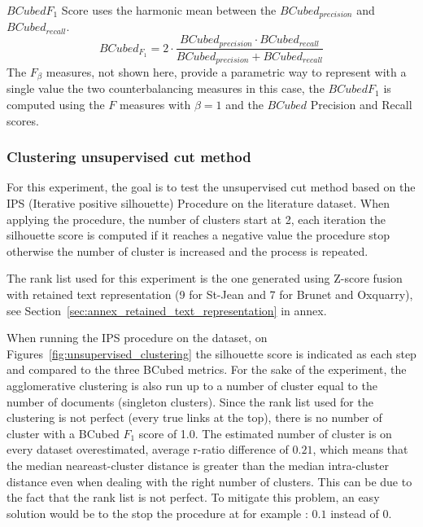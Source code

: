 \begin{definition}
  $BCubed F_1$ Score uses the harmonic mean between the $BCubed_{precision}$ and $BCubed_{recall}$.
  \begin{equation}
    BCubed_{F_1} =
    2 \cdot \frac{BCubed_{precision} \cdot BCubed_{recall}}
    {BCubed_{precision} + BCubed_{recall}}
  \end{equation}
  The $F_\beta$ measures, not shown here, provide a parametric way to represent with a single value the two counterbalancing measures in this case, the $BCubed F_1$ is computed using the $F$ measures with $\beta = 1$ and the $BCubed$ Precision and Recall scores.
\end{definition}

\subsubsection{Clustering unsupervised cut method}

For this experiment, the goal is to test the unsupervised cut method based on the IPS (Iterative positive silhouette) Procedure on the literature dataset.
When applying the procedure, the number of clusters start at 2, each iteration the silhouette score is computed if it reaches a negative value the procedure stop otherwise the number of cluster is increased and the process is repeated.

The rank list used for this experiment is the one generated using Z-score fusion with retained text representation (9 for St-Jean and 7 for Brunet and Oxquarry), see Section~\ref{sec:annex_retained_text_representation} in annex.

When running the IPS procedure on the dataset, on Figures~\ref{fig:unsupervised_clustering} the silhouette score is indicated as each step and compared to the three BCubed metrics.
For the sake of the experiment, the agglomerative clustering is also run up to a number of cluster equal to the number of documents (singleton clusters).
Since the rank list used for the clustering is not perfect (every true links at the top), there is no number of cluster with a BCubed $F_1$ score of 1.0.
The estimated number of cluster is on every dataset overestimated, average r-ratio difference of $0.21$, which means that the median neareast-cluster distance is greater than the median intra-cluster distance even when dealing with the right number of clusters.
This can be due to the fact that the rank list is not perfect.
To mitigate this problem, an easy solution would be to the stop the procedure at for example : $0.1$ instead of $0$.

